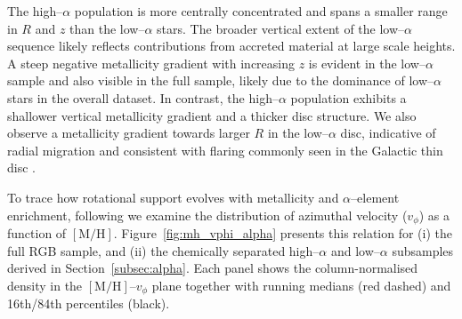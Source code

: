 \documentclass[a4paper,12pt]{article}
\begin{document}
The high–$\alpha$ population is more centrally concentrated and spans a smaller range in $R$ and $z$ than the 
low–$\alpha$ stars. The broader vertical extent of the low–$\alpha$ sequence likely reflects contributions 
from accreted material at large scale heights. A steep negative metallicity gradient with increasing $z$ is 
evident in the low–$\alpha$ sample and also visible in the full sample, likely due to the dominance of 
low–$\alpha$ stars in the overall dataset. In contrast, the high–$\alpha$ population exhibits a shallower 
vertical metallicity gradient and a thicker disc structure. We also observe a metallicity gradient towards 
larger $R$ in the low–$\alpha$ disc, indicative of radial migration and consistent with flaring commonly 
seen in the Galactic thin disc \citep[e.g.][]{Haywood2013,ratcliffe2023}.


To trace how rotational support evolves with metallicity and $\alpha$–element enrichment, following \citet{Vis2024} 
we examine the distribution of azimuthal velocity ($v_\phi$) as a function of $[\mathrm{M/H}]$.  
Figure~\ref{fig:mh_vphi_alpha} presents this relation for (i) the full RGB sample, and (ii) the chemically 
separated high–$\alpha$ and low–$\alpha$ subsamples derived in Section~\ref{subsec:alpha}.  Each panel shows 
the column-normalised density in the $[\mathrm{M/H}]$–$v_\phi$ plane together with running medians 
(red dashed) and 16th/84th percentiles (black).
\end{document}
